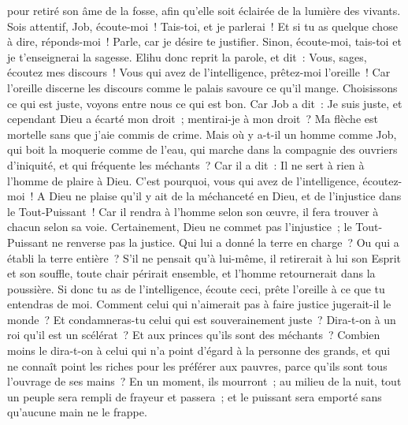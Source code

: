 \begin{multicols}{2}
pour retiré son âme de la fosse, afin qu'elle soit éclairée de la lumière des vivants.
Sois attentif, Job, écoute-moi~! Tais-toi, et je parlerai~!
Et si tu as quelque chose à dire, réponds-moi~! Parle, car je désire te justifier.
Sinon, écoute-moi, tais-toi et je t'enseignerai la sagesse.
\VerseOne{}Elihu donc reprit la parole, et dit~:
Vous, sages, écoutez mes discours~! Vous qui avez de l'intelligence, prêtez-moi l'oreille~!
Car l'oreille discerne les discours comme le palais savoure ce qu'il mange.
Choisissons ce qui est juste, voyons entre nous ce qui est bon.
Car Job a dit~: Je suis juste, et cependant Dieu a écarté mon droit~;
mentirai-je à mon droit~? Ma flèche est mortelle sans que j'aie commis de crime.
Mais où y a-t-il un homme comme Job, qui boit la moquerie comme de l'eau,
qui marche dans la compagnie des ouvriers d'iniquité, et qui fréquente les méchants~? 
Car il a dit~: Il ne sert à rien à l'homme de plaire à Dieu.
 C'est pourquoi, vous qui avez de l'intelligence, écoutez-moi~! A Dieu ne plaise qu'il y ait de la méchanceté en Dieu, et de l'injustice dans le Tout-Puissant~!
Car il rendra à l'homme selon son œuvre, il fera trouver à chacun selon sa voie.
Certainement, Dieu ne commet pas l'injustice~; le Tout-Puissant ne renverse pas la justice.
Qui lui a donné la terre en charge~? Ou qui a établi la terre entière~?
S'il ne pensait qu'à lui-même, il retirerait à lui son Esprit et son souffle,
toute chair périrait ensemble, et l'homme retournerait dans la poussière.
Si donc tu as de l'intelligence, écoute ceci, prête l'oreille à ce que tu entendras de moi.
Comment celui qui n'aimerait pas à faire justice jugerait-il le monde~? Et condamneras-tu celui qui est souverainement juste~?
Dira-t-on à un roi qu'il est un scélérat~? Et aux princes qu'ils sont des méchants~?
Combien moins le dira-t-on à celui qui n'a point d'égard à la personne des grands, et qui ne connaît point les riches pour les préférer aux pauvres, parce qu'ils sont tous l'ouvrage de ses mains~?
En un moment, ils mourront~; au milieu de la nuit, tout un peuple sera rempli de frayeur et passera~; et le puissant sera emporté sans qu'aucune main ne le frappe.

\end{multicols}
